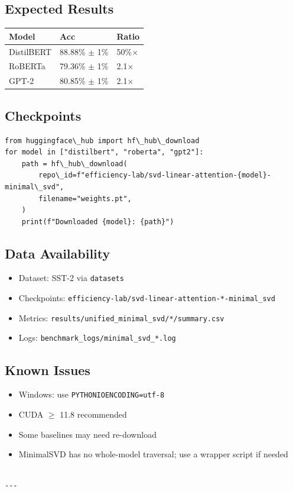 \subsection{Expected Results}

\begin{table}[H]
\centering
\small
\begin{tabular}{lll}
\toprule
\textbf{Model} & \textbf{Acc} & \textbf{Ratio} \\
\midrule
DistilBERT & 88.88\% $\pm$ 1\% & 50\%$\times$ \\
RoBERTa & 79.36\% $\pm$ 1\% & 2.1$\times$ \\
GPT-2 & 80.85\% $\pm$ 1\% & 2.1$\times$ \\
\bottomrule
\end{tabular}
\end{table}

\subsection{Checkpoints}

\begin{lstlisting}
from huggingface\_hub import hf\_hub\_download
for model in ["distilbert", "roberta", "gpt2"]:
    path = hf\_hub\_download(
        repo\_id=f"efficiency-lab/svd-linear-attention-{model}-minimal\_svd",
        filename="weights.pt",
    )
    print(f"Downloaded {model}: {path}")
\end{lstlisting}

\subsection{Data Availability}

\begin{itemize}
\item Dataset: SST-2 via \texttt{datasets}
\item Checkpoints: \texttt{efficiency-lab/svd-linear-attention-*-minimal\_svd}
\item Metrics: \texttt{results/unified\_minimal\_svd/*/summary.csv}
\item Logs: \texttt{benchmark\_logs/minimal\_svd\_*.log}

\end{itemize}
\subsection{Known Issues}

\begin{itemize}
\item Windows: use \texttt{PYTHONIOENCODING=utf-8}
\item CUDA $\ge$ 11.8 recommended
\item Some baselines may need re-download
\item MinimalSVD has no whole-model traversal; use a wrapper script if needed
\end{itemize}
\begin{lstlisting}

---
\end{lstlisting}